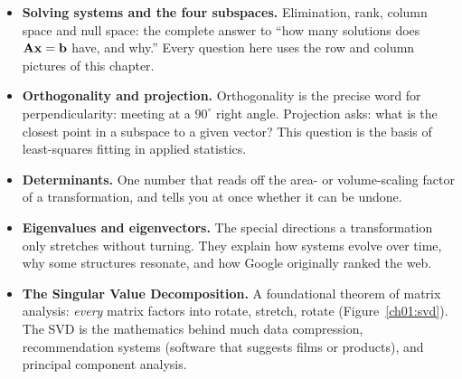 \begin{itemize}
  \item \textbf{Solving systems and the four subspaces.} Elimination, rank, column space and null
  space: the complete answer to ``how many solutions does $\mathbf{A}\mathbf{x}=\mathbf{b}$ have, and why.''
  Every question here uses the row and column pictures of this chapter.
  \item \textbf{Orthogonality and projection.} Orthogonality is the precise word for
  perpendicularity: meeting at a $90^\circ$ right angle. Projection asks: what is the closest
  point in a subspace to a given vector? This question is the basis of least-squares fitting
  in applied statistics.
  \item \textbf{Determinants.} One number that reads off the area- or volume-scaling factor of a
  transformation, and tells you at once whether it can be undone.
  \item \textbf{Eigenvalues and eigenvectors.} The special directions a transformation only
  stretches without turning. They explain how systems evolve over time, why some structures resonate,
  and how Google originally ranked the web.
  \item \textbf{The Singular Value Decomposition.} A foundational theorem of matrix
  analysis: \emph{every} matrix factors into rotate, stretch, rotate (Figure~\ref{ch01:svd}).
  The SVD is the mathematics behind much data compression, recommendation systems (software that
  suggests films or products), and principal component analysis.
\end{itemize}

